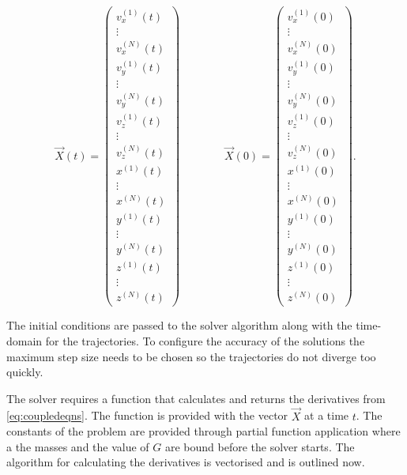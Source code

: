 \documentclass{physics_article_B}
\begin{document}
\begin{equation}
 \vec{X}(t) =
 \begin{pmatrix}
 v_x^{(1)}(t) \\ \vdots \\ v_x^{(N)}(t) \\ v_y^{(1)}(t) \\ \vdots \\ v_y^{(N)}(t) \\ v_z^{(1)}(t) \\ \vdots \\ v_z^{(N)}(t) \\ x^{(1)}(t) \\ \vdots \\ x^{(N)}(t) \\ y^{(1)}(t) \\ \vdots \\ y^{(N)}(t) \\ z^{(1)}(t) \\ \vdots \\ z^{(N)}(t)
 \end{pmatrix}
 \qquad\qquad
 \vec{X}(0) = \begin{pmatrix}
 v_x^{(1)}(0) \\ \vdots \\ v_x^{(N)}(0) \\ v_y^{(1)}(0) \\ \vdots \\ v_y^{(N)}(0) \\ v_z^{(1)}(0) \\ \vdots \\ v_z^{(N)}(0) \\ x^{(1)}(0) \\ \vdots \\ x^{(N)}(0) \\ y^{(1)}(0) \\ \vdots \\ y^{(N)}(0) \\ z^{(1)}(0) \\ \vdots \\ z^{(N)}(0)
 \end{pmatrix}
 .
 \label{eq:statevector}
\end{equation}

The initial conditions are passed to the solver algorithm along with the time-domain for the trajectories. To configure the accuracy of the solutions the maximum step size needs to be chosen so the trajectories do not diverge too quickly.

The solver requires a function that calculates and returns the derivatives from \cref{eq:coupledeqns}. The function is provided with the vector $\vec{X}$ at a time $t$. The constants of the problem are provided through partial function application where a the masses and the value of $G$ are bound before the solver starts. The algorithm for calculating the derivatives is vectorised and is outlined now.
\end{document}
